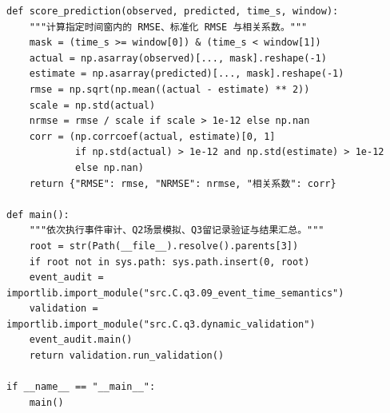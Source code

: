\begin{lstlisting}[style=appendixPython]
def score_prediction(observed, predicted, time_s, window):
    """计算指定时间窗内的 RMSE、标准化 RMSE 与相关系数。"""
    mask = (time_s >= window[0]) & (time_s < window[1])
    actual = np.asarray(observed)[..., mask].reshape(-1)
    estimate = np.asarray(predicted)[..., mask].reshape(-1)
    rmse = np.sqrt(np.mean((actual - estimate) ** 2))
    scale = np.std(actual)
    nrmse = rmse / scale if scale > 1e-12 else np.nan
    corr = (np.corrcoef(actual, estimate)[0, 1]
            if np.std(actual) > 1e-12 and np.std(estimate) > 1e-12
            else np.nan)
    return {"RMSE": rmse, "NRMSE": nrmse, "相关系数": corr}

def main():
    """依次执行事件审计、Q2场景模拟、Q3留记录验证与结果汇总。"""
    root = str(Path(__file__).resolve().parents[3])
    if root not in sys.path: sys.path.insert(0, root)
    event_audit = importlib.import_module("src.C.q3.09_event_time_semantics")
    validation = importlib.import_module("src.C.q3.dynamic_validation")
    event_audit.main()
    return validation.run_validation()

if __name__ == "__main__":
    main()

\end{lstlisting}
